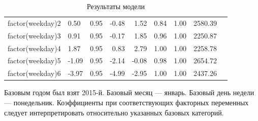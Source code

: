 \documentclass[a4paper, 14pt]{article}
\begin{document}
\begin{table}[ht]
\begin{tabular}{rlrrrrrrr}
		factor(weekday)2 & 0.50 & 0.95 & -0.48 & 1.52 & 0.84 & 1.00 & 2580.39 \\ 
		factor(weekday)3 & 0.91 & 0.95 & -0.17 & 1.85 & 0.96 & 1.00 & 2250.87 \\ 
		factor(weekday)4 & 1.87 & 0.95 & 0.83 & 2.79 & 1.00 & 1.00 & 2258.78 \\ 
		factor(weekday)5 & -1.09 & 0.95 & -2.14 & -0.08 & 0.98 & 1.00 & 2654.72 \\ 
		factor(weekday)6 & -3.97 & 0.95 & -4.99 & -2.95 & 1.00 & 1.00 & 2437.26 \\ 
		\hline
	\end{tabular}
	\caption{Результаты модели}
\end{table}

Базовым годом был взят 2015-й. Базовый месяц --- январь. Базовый день недели --- понедельник. Коэффициенты при соответствующих факторных переменных следует интерпретировать относительно указанных базовых категорий. 

 




\newpage
\end{document}

